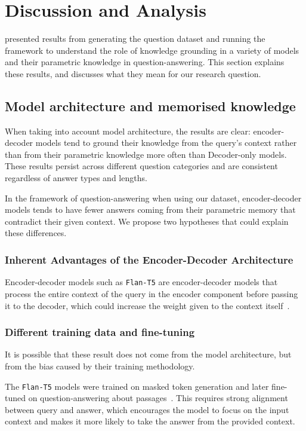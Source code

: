 \section{Discussion and Analysis}
\label{discussion}

 presented results from generating the question dataset and running the framework to understand the role of knowledge grounding in a variety of models and their parametric knowledge in question-answering.
This section explains these results, and discusses what they mean for our research question.

\subsection{Model architecture and memorised knowledge}
\label{model_architecture_parametric}

When taking into account model architecture, the results are clear: encoder-decoder models tend to ground their knowledge from the query's context rather than from their parametric knowledge more often than Decoder-only models.
These results persist across different question categories and are consistent regardless of answer types and lengths.

In the framework of question-answering when using our dataset, encoder-decoder models tends to have fewer answers coming from their parametric memory that contradict their given context.
We propose two hypotheses that could explain these differences.

\subsubsection{Inherent Advantages of the Encoder-Decoder Architecture}

Encoder-decoder models such as \texttt{Flan-T5} are encoder-decoder models that process the entire context of the query in the encoder component before passing it to the decoder, which could increase the weight given to the context itself~\cite{flant5}.

\subsubsection{Different training data and fine-tuning}

It is possible that these result does not come from the model architecture, but from the bias caused by their training methodology.

The \texttt{Flan-T5} models were trained on masked token generation and later fine-tuned on question-answering about passages~\cite{flant5}.
This requires strong alignment between query and answer, which encourages the model to focus on the input context and makes it more likely to take the answer from the provided context.

